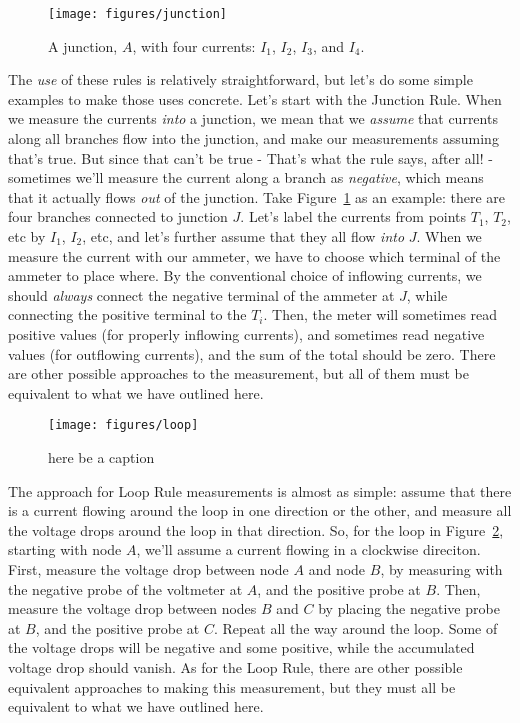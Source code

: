 \documentclass[12pt]{article}
\begin{document}
\begin{figure}
  \centering
  \texttt{[image: figures/junction]}
  \caption{A junction, $A$, with four currents: $I_1$, $I_2$, $I_3$,
    and $I_4$.}
  \label{fig:junction}
\end{figure}
The \textit{use} of these rules is relatively straightforward, but
let's do some simple examples to make those uses concrete.  Let's
start with the Junction Rule.  When we measure the currents
\textit{into} a junction, we mean that we \textit{assume} that
currents along all branches flow into the junction, and make our
measurements assuming that's true.  But since that can't be true -
That's what the rule says, after all! - sometimes we'll measure the
current along a branch as \textit{negative}, which means that it
actually flows \textit{out} of the junction.  Take
Figure~\ref{fig:junction} as an example: there are four branches
connected to junction $J$.  Let's label the currents from points
$T_1$, $T_2$, etc by $I_1$, $I_2$, etc, and let's further assume that
they all flow \textit{into} $J$.  When we measure the current with our
ammeter, we have to choose which terminal of the ammeter to place
where.  By the conventional choice of inflowing currents, we should
\textit{always} connect the negative terminal of the ammeter at $J$,
while connecting the positive terminal to the $T_i$.  Then, the meter
will sometimes read positive values (for properly inflowing currents),
and sometimes read negative values (for outflowing currents), and the
sum of the total should be zero.  There are other possible approaches
to the measurement, but all of them must be equivalent to what we have
outlined here.

\begin{figure}
  \centering
  \texttt{[image: figures/loop]}
  \caption{here be a caption}
  \label{fig:loop}
\end{figure}
The approach for Loop Rule measurements is almost as simple:  assume
that there is a current flowing around the loop in one direction or
the other, and measure all the voltage drops around the loop in that
direction.  So, for the loop in Figure~\ref{fig:loop}, starting with
node $A$, we'll assume a current flowing in a clockwise direciton.
First, measure the voltage drop between node $A$ and node $B$, by
measuring with the negative probe of the voltmeter at $A$, and the
positive probe at $B$.  Then, measure the voltage drop between nodes
$B$ and $C$ by placing the negative probe at $B$, and the positive
probe at $C$.  Repeat all the way around the loop.  Some of the
voltage drops will be negative and some positive, while the
accumulated voltage drop should vanish.  As for the Loop Rule, there
are other possible equivalent approaches to making this measurement,
but they must all be equivalent to what we have outlined here.
\end{document}

